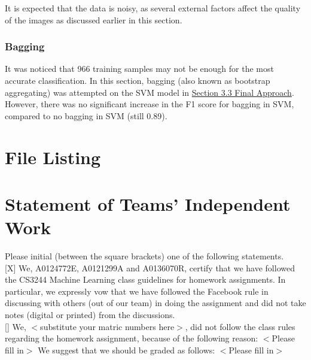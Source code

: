 \documentclass{article}
\begin{document}
It is expected that the data is noisy, as several external factors affect the quality of the images as discussed earlier in this section.

\subsubsection{Bagging}
It was noticed that 966 training samples may not be enough for the most accurate classification. In this section, bagging (also known as bootstrap aggregating) was attempted on the SVM model in \hyperref[sec:3.3]{Section 3.3 Final Approach}. \\

However, there was no significant increase in the F1 score for bagging in SVM, compared to no bagging in SVM (still 0.89).

\newpage

\section{File Listing}
\newpage

\section{Statement of Teams' Independent Work}
Please initial (between the square brackets) one of the following statements. \\

[X] We, A0124772E, A0121299A and A0136070R, certify that we have followed the CS3244 Machine Learning class guidelines for homework assignments. In particular, we expressly vow that we have followed the Facebook rule in discussing with others (out of our team) in doing the assignment and did not take notes (digital or printed) from the discussions. \\

[] We, $<$substitute your matric numbers here$>$, did not follow the class rules regarding the homework assignment, because of the following reason: $<$Please fill in$>$
We suggest that we should be graded as follows: $<$Please fill in$>$
\newpage
\end{document}
